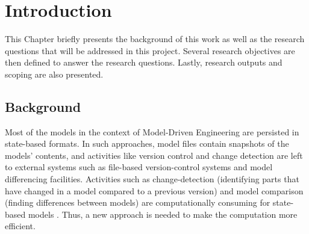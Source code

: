 \documentclass[12pt, a4paper]{report} \usepackage[titletoc]{appendix}
\begin{document}
\tableofcontents
{}


\listoftables
\newpage


\chapter{Introduction}
\label{ch:introduction}
This Chapter briefly presents the background of this work as well as the research questions that will be addressed in this project. Several research objectives are then defined to answer the research questions. Lastly, research outputs and scoping are also presented. 

\section{Background}
\label{sec:background}
Most of the models in the context of Model-Driven Engineering are persisted in state-based formats. In such approaches, model files contain snapshots of the models' contents, and activities like version control and change detection are left to external systems such as file-based version-control systems and model differencing facilities. Activities such as change-detection (identifying parts that have changed in a model compared to a previous version) and model comparison (finding differences between models) are computationally consuming for state-based models \cite{Kolovos:2009:DMM:1564596.1564641}.  Thus, a new approach is needed to make the computation more efficient.
\end{document}
